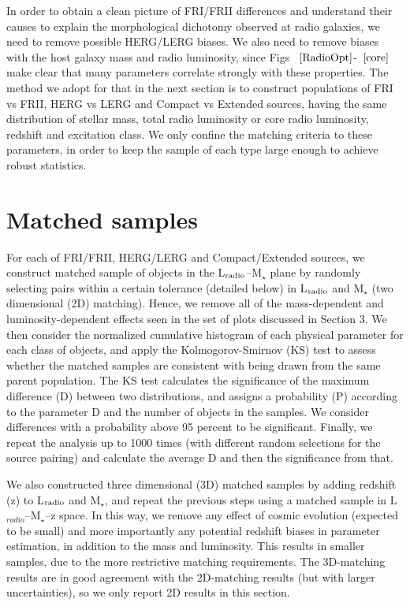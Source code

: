 \documentclass[usenatbib]{mn2e}
\begin{document}
In order to obtain a clean picture of FRI/FRII differences and understand
their causes to explain the morphological dichotomy observed at radio
galaxies, we need to remove possible HERG/LERG biases. We also need to remove biases with
the host galaxy mass and radio luminosity, since Figs ~$\ref{RadioOpt}$-~$\ref{core}$ make clear
that many parameters correlate strongly with these properties. The method
we adopt for that in the next section is to construct populations of FRI
vs FRII, HERG vs LERG and Compact vs Extended sources, having the same
distribution of stellar mass, total radio luminosity or core radio
luminosity, redshift and excitation class. We only confine the matching
criteria to these parameters, in order to keep the sample of each type
large enough to achieve robust statistics.



\section{Matched samples}


For each of FRI/FRII, HERG/LERG and Compact/Extended sources, we construct
matched sample of objects in the L$_{\rm radio}$--M$_{\star}$ plane by randomly
selecting pairs within a certain tolerance (detailed below) in L$_{\rm radio}$
and M$_{\star}$ (two dimensional (2D) matching). Hence, we remove all of
the mass-dependent and luminosity-dependent effects seen in the set of
plots discussed in Section 3. We then consider the normalized cumulative
histogram of each physical parameter for each class of objects, and apply
the Kolmogorov-Smirnov (KS) test to assess whether the matched samples are
consistent with being drawn from the same parent population. The KS test
calculates the significance of the maximum difference (D) between two
distributions, and assigns a probability (P) according to the parameter D
and the number of objects in the samples. We consider differences with a
probability above 95 percent to be significant. Finally, we repeat the analysis
up to 1000 times (with different random selections for the source pairing)
and calculate the average D and then the significance from that.

We also constructed three dimensional (3D) matched samples by adding
redshift (z) to L$_{\rm radio}$ and M$_{\star}$, and repeat the previous steps
using a matched sample in L$_{radio}$--M$_{\star}$--z space. In this way,
we remove any effect of cosmic evolution (expected to be small) and more importantly 
any potential redshift biases in parameter
estimation, in addition to the mass and luminosity. This results in
smaller samples, due to the more restrictive matching requirements. The
3D-matching results are in good agreement with the 2D-matching results
(but with larger uncertainties), so we only report 2D results in this
section.
\end{document}
